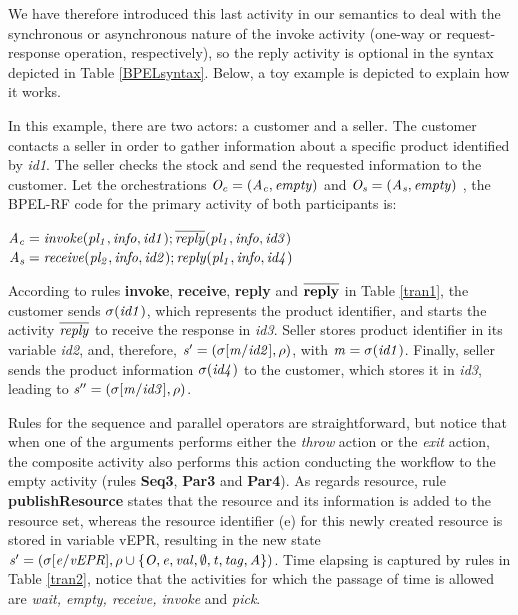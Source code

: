 We have therefore introduced this last activity
in our semantics to deal with the synchronous or asynchronous nature of
the invoke activity (one-way or request-response operation, respectively), so the
reply activity is optional in the syntax depicted in Table \ref{BPELsyntax}. Below, a toy example 
is depicted to explain how it works.
\begin{example}\label{ex1} 
In this example, there are two actors: a customer and a
seller. The customer contacts a seller in order to gather information about a specific product identified by \emph{id1}. The seller checks the stock and send the requested information to the customer. Let the orchestrations ${\it O_{c}= (A_{c},empty)}$ and ${\it O_{s}= (A_{s},empty)}$ , the BPEL-RF code for the primary activity of both participants is:
\vspace{0.3cm}
\begin{flushleft}
\hspace{1cm}${\it A_{c}= invoke(pl_1,info,id1);\overline{reply}(pl_1,info,id3)}$\\
\hspace{1cm}${\it A_{s}= receive(pl_2,info,id2);reply(pl_1,info,id4)}$
\end{flushleft}
\end{example}

According to rules {\bf invoke}, {\bf receive}, {\bf reply} and {\bf $\overline{{\bf reply}}$} in Table \ref{tran1},  the customer sends ${\it \sigma(id1)}$, which represents the product identifier, and starts the activity ${\it \overline{reply}}$ to receive the response in {\it id3}. Seller stores product identifier in its variable {\it id2}, and, therefore, ${\it s'=(\sigma[m/id2],\rho)}$, with ${\it m=\sigma(id1)}$. Finally, seller sends the product information ${\it \sigma(id4)}$ to the customer, which stores it in {\it id3}, leading to ${\it s''=(\sigma[m/id3],\rho)}$.

Rules for the sequence and parallel operators are straightforward, but notice that when one of the
arguments performs either the \emph{throw} action or the \emph{exit} action, the composite
activity also performs this action conducting the workflow to the empty activity (rules {\bf Seq3}, {\bf Par3} and {\bf Par4}). As regards resource, rule {\bf publishResource} states that the resource and its information is added to the resource set, whereas the resource identifier (e) for this newly created resource is stored in variable vEPR, resulting in the new state $\it{s'=(\sigma[e/vEPR], \rho \cup \{O,e,val,\emptyset,t,tag,A\})}$. Time elapsing is captured by rules in Table \ref{tran2}, notice that the activities for which the passage of time is allowed are {\em wait, empty, receive, invoke} and {\em pick}.

